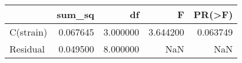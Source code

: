 \begin{tabular}{lrrrr}
\toprule
 & sum\_sq & df & F & PR(\textgreater{}F) \\
\midrule
C(strain) & 0.067645 & 3.000000 & 3.644200 & 0.063749 \\
Residual & 0.049500 & 8.000000 & NaN & NaN \\
\bottomrule
\end{tabular}
